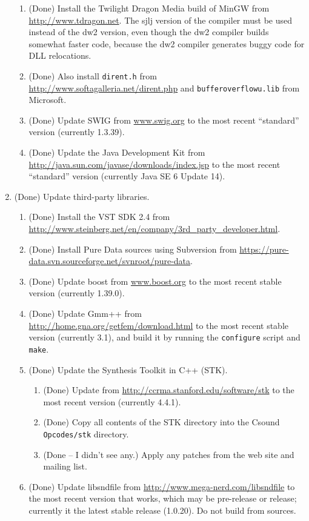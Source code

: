\documentclass[11pt,letterpaper,onecolumn]{scrartcl}
\begin{document}
\begin{sloppypar}
\begin{enumerate}
\begin{enumerate}
			\item (Done) Install the Twilight Dragon Media build of MinGW from \url{http://www.tdragon.net}. The sjlj version of the compiler must be used instead of the dw2 version, even though the dw2 compiler builds somewhat faster code, because the dw2 compiler generates buggy code for DLL relocations.
			\item (Done) Also install \texttt{dirent.h} from \url{http://www.softagalleria.net/dirent.php} and \texttt{bufferoverflowu.lib}  from Microsoft.
	    \item (Done) Update SWIG from \url{www.swig.org} to the most recent ``standard'' version (currently 1.3.39).
	    \item (Done) Update the Java Development Kit from \url{http://java.sun.com/javase/downloads/index.jsp} to the most recent ``standard'' version (currently Java SE 6 Update 14).
		\end{enumerate}    
	\item (Done) Update third-party libraries.   
		\begin{enumerate}
    	\item (Done) Install the VST SDK 2.4 from \url{http://www.steinberg.net/en/company/3rd_party_developer.html}.
    	\item (Done) Install Pure Data sources using Subversion from \url{https://pure-data.svn.sourceforge.net/svnroot/pure-data}.
   		\item (Done) Update boost from \url{www.boost.org} to the most recent stable version (currently 1.39.0).
  		\item (Done) Update Gmm++ from \url{http://home.gna.org/getfem/download.html} to the most recent stable version (currently 3.1), and build it by running the \texttt{configure} script and \texttt{make}.
    	\item (Done) Update the Synthesis Toolkit in C++ (STK).
				\begin{enumerate}
					\item (Done) Update from \url{http://ccrma.stanford.edu/software/stk} to the most recent version (currently 4.4.1). 
					\item (Done) Copy all contents of the STK directory into the Csound \texttt{Opcodes/stk} directory.
					\item (Done -- I didn't see any.) Apply any patches from the web site and mailing list. 
				\end{enumerate}   	
			\item (Done) Update libsndfile from \url{http://www.mega-nerd.com/libsndfile} to the most recent version that works, which may be pre-release or release; currently it the latest stable release (1.0.20). Do not build from sources. 

\end{enumerate}
\end{enumerate}
\end{sloppypar}
\end{document}

